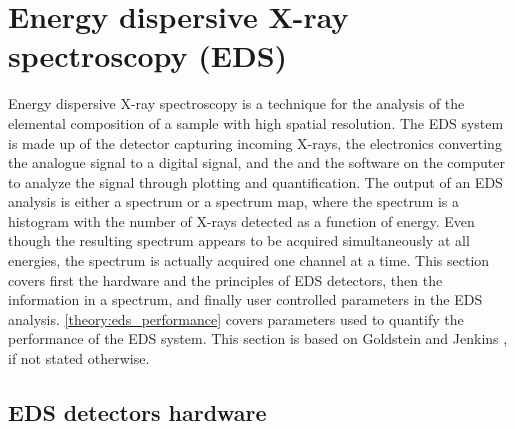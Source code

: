 

















\clearpage


\section{Energy dispersive X-ray spectroscopy (EDS)}
\label{theory:eds}





Energy dispersive X-ray spectroscopy is a technique for the analysis of the elemental composition of a sample with high spatial resolution.
The EDS system is made up of the detector capturing incoming X-rays, the electronics converting the analogue signal to a digital signal, and the and the software on the computer to analyze the signal through plotting and quantification.
The output of an EDS analysis is either a spectrum or a spectrum map, where the spectrum is a histogram with the number of X-rays detected as a function of energy.
Even though the resulting spectrum appears to be acquired simultaneously at all energies, the spectrum is actually acquired one channel at a time.
This section covers first the hardware and the principles of EDS detectors, then the information in a spectrum, and finally user controlled parameters in the EDS analysis.
\cref{theory:eds_performance} covers parameters used to quantify the performance of the EDS system. %
This section is based on Goldstein \cite{goldstein_scanning_2018} and Jenkins \cite{jenkins_xrayspectroscopy}, if not stated otherwise.




\subsection{EDS detectors hardware}
\label{theory:eds:hardware}

